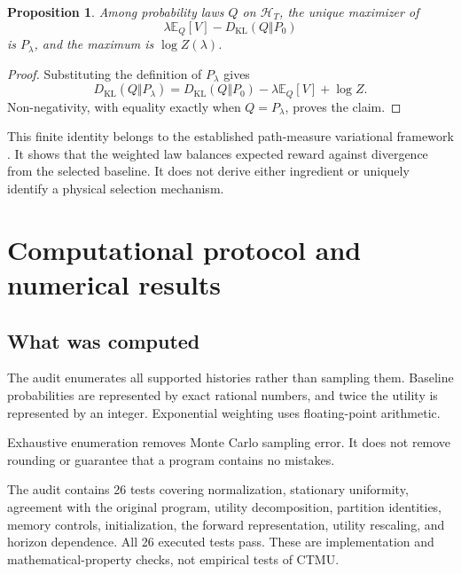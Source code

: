 \documentclass[11pt]{article}
\newtheorem{proposition}{Proposition}
\theoremstyle{remark}
\newcommand{\KL}{D_{\mathrm{KL}}}
\newcommand{\E}{\mathbb{E}}
\newcommand{\Hcal}{\mathcal{H}}
\begin{document}
\begin{proposition}
Among probability laws \(Q\) on \(\Hcal_T\), the unique maximizer of
\begin{equation}
\lambda\E_Q[V]
-
\KL(Q\Vert P_0)
\end{equation}
is \(P_\lambda\), and the maximum is \(\log Z(\lambda)\).
\end{proposition}

\begin{proof}
Substituting the definition of \(P_\lambda\) gives
\begin{equation}
\KL(Q\Vert P_\lambda)
=
\KL(Q\Vert P_0)
-
\lambda\E_Q[V]
+
\log Z.
\end{equation}
Non-negativity, with equality exactly when \(Q=P_\lambda\), proves the claim.
\end{proof}

This finite identity belongs to the established path-measure variational framework \cite{chetrite2015control}. It shows that the weighted law balances expected reward against divergence from the selected baseline. It does not derive either ingredient or uniquely identify a physical selection mechanism.

\section{Computational protocol and numerical results}

\subsection{What was computed}

The audit enumerates all supported histories rather than sampling them. Baseline probabilities are represented by exact rational numbers, and twice the utility is represented by an integer. Exponential weighting uses floating-point arithmetic.

Exhaustive enumeration removes Monte Carlo sampling error. It does not remove rounding or guarantee that a program contains no mistakes.

The audit contains 26 tests covering normalization, stationary uniformity, agreement with the original program, utility decomposition, partition identities, memory controls, initialization, the forward representation, utility rescaling, and horizon dependence. All 26 executed tests pass. These are implementation and mathematical-property checks, not empirical tests of CTMU.
\end{document}
